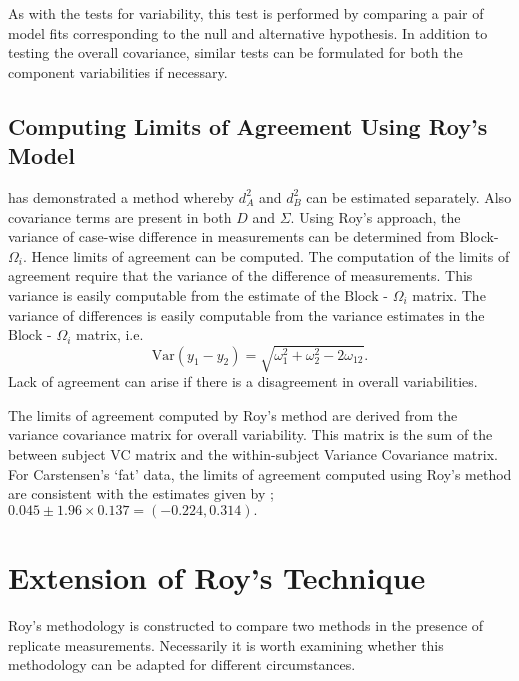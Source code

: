 \documentclass[12pt, a4paper]{report}
\theoremstyle{plain}
\theoremstyle{definition}
\theoremstyle{remark}
\begin{document}
As with the tests for variability, this test is performed by comparing a pair of model fits corresponding to the null and alternative hypothesis. In addition to testing the overall covariance, similar tests can be formulated for both the component variabilities if necessary.



\subsection{Computing Limits of Agreement Using Roy's Model}
	\citet{ARoy2009} has demonstrated a method whereby $d^2_{A}$ and $d^2_{B}$ can be estimated separately. Also covariance terms are present in both ${D}$ and ${\Sigma}$. Using Roy's approach, the variance of case-wise difference in measurements can be determined from Block-${\Omega}_{i}$. Hence limits of agreement can be computed. The computation of the limits of agreement require that the variance of the difference of measurements. This variance is easily computable from the estimate of the ${\mbox{Block - } \Omega_{i}}$ matrix.
	The variance of differences is easily computable from the variance estimates in the ${\mbox{Block - } \Omega_{i}}$ matrix, i.e.
	\[
	\mathrm{Var}(y_1 - y_2) = \sqrt{ \omega^2_1 + \omega^2_2 - 2\omega_{12}}.
	\]
	Lack of agreement can arise if there is a disagreement in overall variabilities.
	
	The limits of agreement computed by Roy's method are derived from the variance covariance matrix for overall variability.
	This matrix is the sum of the between subject VC matrix and the within-subject Variance Covariance matrix.
	For Carstensen's `fat' data, the limits of agreement computed using Roy's
	method are consistent with the estimates given by \citet{BXC2008}; $0.045  \pm 1.96 \times  0.137 = (-0.224,  0.314).$
	
	
	
	

	


\section{Extension of Roy's Technique}
Roy's methodology is constructed to compare two methods in the presence of replicate measurements. Necessarily it is worth examining whether this methodology can be adapted for different circumstances.
\end{document}
